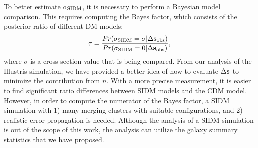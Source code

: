 To better estimate $\sigma_{\rm SIDM}$, it is necessary to perform a Bayesian model 
comparison. This requires computing the Bayes factor, which consists of the
posterior ratio of different DM models:
\begin{equation}
	\tau = \frac{Pr(\sigma_{\rm SIDM} = \sigma| \Delta {\bf s}_{\rm obs})}{Pr(\sigma_{\rm SIDM} = 0|
		\Delta {\bf s}_{\rm obs})},
\end{equation}
where $\sigma$ is a cross section value that is being compared.
From our analysis of the Illustris simulation, we have provided a better idea of how to evaluate 
$\Delta {\bf s}$ to minimize the contribution from $n$. 
With a more precise measurement, it is easier to find significant ratio differences
between SIDM models and the CDM model. 
However, in order to compute the numerator of
the Bayes factor, a SIDM simulation with 1) many merging clusters with suitable
configurations, and 2) realistic error propagation is needed.  
Although the analysis of a SIDM simulation is out of the scope of this work, 
the analysis can utilize the galaxy summary statistics that we have proposed.  



